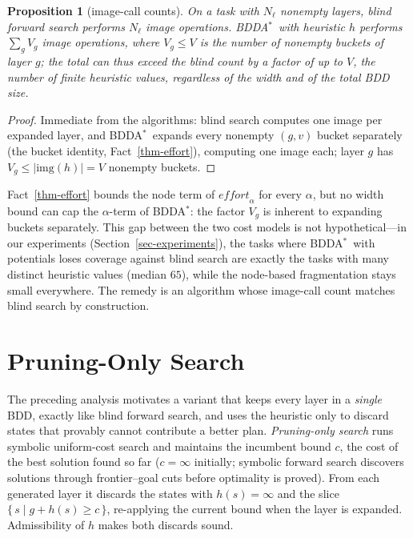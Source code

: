 \documentclass[letterpaper]{article}
\newcommand{\values}{\ensuremath{V}}
\newcommand{\effort}{\ensuremath{\mathit{effort}}}
\newcommand{\img}{\ensuremath{\mathrm{img}}}
\newcommand{\bddastar}{BDDA\ensuremath{^{*}}}
\theoremstyle{plain}
\newtheorem{proposition}{Proposition}
\theoremstyle{definition}
\theoremstyle{remark}
\begin{document}
\begin{proposition}[image-call counts]
\label{prop-calls}
On a task with $N_\ell$ nonempty layers, blind forward search performs
$N_\ell$ image operations. \bddastar\ with heuristic $h$ performs
$\sum_{g} \values_g$ image operations, where $\values_g \leq \values$ is
the number of nonempty buckets of layer $g$; the total can thus exceed
the blind count by a factor of up to $\values$, the number of finite
heuristic values, regardless of the width and of the total BDD size.
\end{proposition}

\begin{proof}
Immediate from the algorithms: blind search computes one image per
expanded layer, and \bddastar\ expands every nonempty $(g, v)$ bucket
separately (the bucket identity, Fact~\ref{thm-effort}), computing one image each; layer
$g$ has $\values_g \leq |\img(h)| = \values$ nonempty buckets.
\end{proof}

Fact~\ref{thm-effort} bounds the node term of $\effort_\alpha$ for
every $\alpha$, but no width bound can cap the $\alpha$-term of \bddastar:
the factor $\values_g$ is inherent to expanding buckets separately. This
gap between the two cost models is not hypothetical---in our experiments
(Section~\ref{sec-experiments}), the tasks where \bddastar\ with
potentials loses coverage against blind search are exactly the tasks with
many distinct heuristic values (median $65$), while the node-based
fragmentation stays small everywhere. The remedy is an algorithm whose
image-call count matches blind search by construction.

\section{Pruning-Only Search}
\label{sec-prune}

The preceding analysis motivates a
variant that keeps every layer in a \emph{single} BDD, exactly like blind
forward search, and uses the heuristic only to discard states that
provably cannot contribute a better plan. \emph{Pruning-only search} runs
symbolic uniform-cost search and maintains the incumbent bound $c$, the
cost of the best solution found so far ($c = \infty$ initially; symbolic
forward search discovers solutions through frontier--goal cuts before
optimality is proved). From each generated layer it discards the states
with $h(s) = \infty$ and the slice $\{\, s \mid g + h(s) \geq c \,\}$,
re-applying the current bound when the layer is expanded. Admissibility
of $h$ makes both discards sound.
\end{document}
